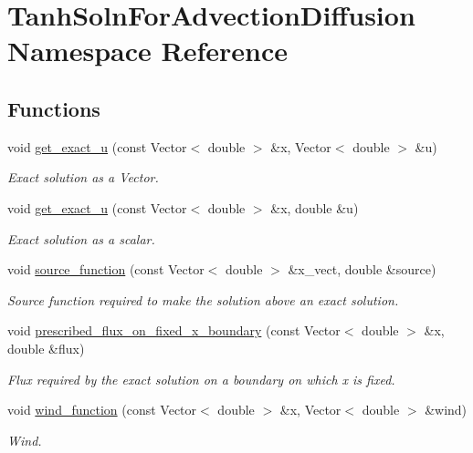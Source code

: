 \hypertarget{namespaceTanhSolnForAdvectionDiffusion}{}\section{Tanh\+Soln\+For\+Advection\+Diffusion Namespace Reference}
\label{namespaceTanhSolnForAdvectionDiffusion}
\subsection*{Functions}
\begin{DoxyCompactItemize}
\item 
void \hyperlink{namespaceTanhSolnForAdvectionDiffusion_ae4c9ed0a4f123ec8e634f0cc45bfcebc}{get\+\_\+exact\+\_\+u} (const Vector$<$ double $>$ \&x, Vector$<$ double $>$ \&u)
\begin{DoxyCompactList}\small\item\em Exact solution as a Vector. \end{DoxyCompactList}\item 
void \hyperlink{namespaceTanhSolnForAdvectionDiffusion_af302dc41c1e494b3430fe6654bd1fd39}{get\+\_\+exact\+\_\+u} (const Vector$<$ double $>$ \&x, double \&u)
\begin{DoxyCompactList}\small\item\em Exact solution as a scalar. \end{DoxyCompactList}\item 
void \hyperlink{namespaceTanhSolnForAdvectionDiffusion_aaa1aa95713b02b211812fdd18eeaa369}{source\+\_\+function} (const Vector$<$ double $>$ \&x\+\_\+vect, double \&source)
\begin{DoxyCompactList}\small\item\em Source function required to make the solution above an exact solution. \end{DoxyCompactList}\item 
void \hyperlink{namespaceTanhSolnForAdvectionDiffusion_abe08f9a34481f9c6d6d4708f19f4cd41}{prescribed\+\_\+flux\+\_\+on\+\_\+fixed\+\_\+x\+\_\+boundary} (const Vector$<$ double $>$ \&x, double \&flux)
\begin{DoxyCompactList}\small\item\em Flux required by the exact solution on a boundary on which x is fixed. \end{DoxyCompactList}\item 
void \hyperlink{namespaceTanhSolnForAdvectionDiffusion_ab40e93031d34986762c69616c3c8b065}{wind\+\_\+function} (const Vector$<$ double $>$ \&x, Vector$<$ double $>$ \&wind)
\begin{DoxyCompactList}\small\item\em Wind. \end{DoxyCompactList}\end{DoxyCompactItemize}
